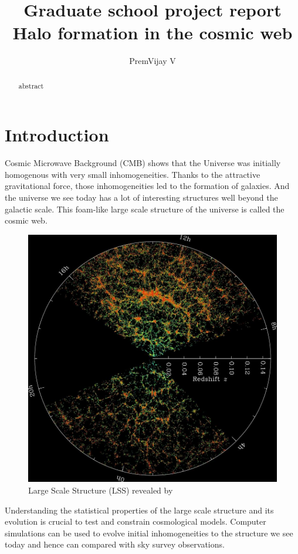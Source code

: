 \documentclass[12pt,twocolumn]{article}
\title{Graduate school project report\\
	Halo formation in the cosmic web}
\author{PremVijay V}
\begin{document}
\maketitle

\begin{abstract}
abstract
\end{abstract}

\section{Introduction}
Cosmic Microwave Background (CMB) shows that the Universe was initially homogenous with very small inhomogeneities. Thanks to the attractive gravitational force, those inhomogeneities led to the formation of galaxies. And the universe we see today has a lot of interesting structures well beyond the galactic scale. This foam-like large scale structure of the universe is called the cosmic web.

\begin{figure}[H]
	\centering
	\includegraphics[width=0.9\linewidth]{orangepie}
	\caption{ Large Scale Structure (LSS) revealed by \cite{cite_sdss}}
	\label{fig:orangepie}
\end{figure}
\noindent
Understanding the statistical properties of the large scale structure and its evolution is crucial to test and constrain cosmological models. Computer simulations can be used to evolve initial inhomogeneities to the structure we see today and hence can compared with sky survey observations.
\end{document}

